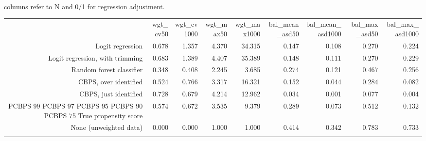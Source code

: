 columns refer to N and 0/1 for regression adjustment.
\begin{center}
\begin{tabular}{rrrrrrrrr}
\hline \noalign{\smallskip} & wgt_cv50 & wgt_cv1000 & wgt_max50 & wgt_max1000 & bal_mean_asd50 & bal_mean_asd1000 & bal_max_asd50 & bal_max_asd1000\\
\noalign{\smallskip}\hline \noalign{\smallskip}Logit regression & 0.678 & 1.357 & 4.370 & 34.315 & 0.147 & 0.108 & 0.270 & 0.224\\
Logit regression, with trimming & 0.683 & 1.389 & 4.407 & 35.389 & 0.148 & 0.111 & 0.270 & 0.229\\
Random forest classifier & 0.348 & 0.408 & 2.245 & 3.685 & 0.274 & 0.121 & 0.467 & 0.256\\
CBPS, over identified & 0.524 & 0.766 & 3.317 & 16.321 & 0.152 & 0.044 & 0.284 & 0.082\\
CBPS, just identified & 0.728 & 0.679 & 4.214 & 12.962 & 0.034 & 0.001 & 0.077 & 0.004\\
PCBPS 99%
PCBPS 97%
PCBPS 95%
PCBPS 90%
PCBPS 75%
True propensity score & 0.574 & 0.672 & 3.535 & 9.379 & 0.289 & 0.073 & 0.512 & 0.132\\
None (unweighted data) & 0.000 & 0.000 & 1.000 & 1.000 & 0.414 & 0.342 & 0.783 & 0.733\\
\noalign{\smallskip}\hline\end{tabular}\\
\end{center}

